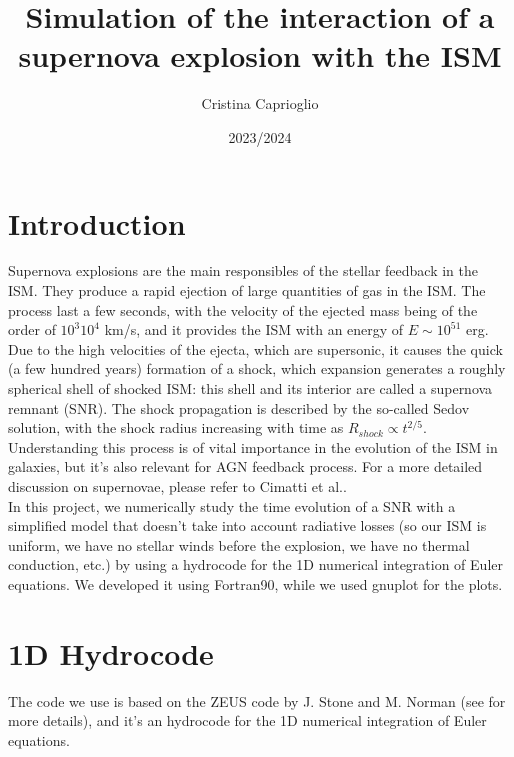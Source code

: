 \documentclass{article}
\title{Simulation of the interaction of a supernova explosion with the ISM}
\author{Cristina Caprioglio}
\date{2023/2024 }
\begin{document}
\maketitle

\section*{Introduction}\label{intro}
Supernova explosions are the main responsibles of the stellar feedback in the ISM. They produce a rapid ejection of large quantities of gas in the ISM. The process last a few seconds, with the velocity of the ejected mass being of the order of $10^{3}$\textemdash$10^{4}$ km/s, and it provides the ISM with an energy of $E\sim 10^{51}$ erg. Due to the high velocities of the ejecta, which are supersonic, it causes the quick (a few hundred years) formation of a shock, which expansion generates a roughly spherical shell of shocked ISM: this shell and its interior are called a supernova remnant (SNR). 
The shock propagation is described by the so-called Sedov solution, with the shock radius increasing with time as $R_{shock}\propto t^{2/5}$. Understanding this process is of vital importance in the evolution of the ISM in galaxies, but it's also relevant for AGN feedback process. 
For a more detailed discussion on supernovae, please refer to Cimatti et al.\cite[Sec. 8.7]{cimatti}.\\
In this project, we numerically study the time evolution of a SNR with a simplified model that doesn't take into account radiative losses (so our ISM is uniform,  we have no stellar winds before the explosion, we have no thermal conduction, etc.) by using a hydrocode for the 1D numerical integration of Euler equations. We developed it using Fortran90, while we used gnuplot for the plots.
\section{1D Hydrocode}
The code we use is based on the ZEUS code by J. Stone and M. Norman (see \cite{stone} for more details), and it's an hydrocode for the 1D numerical integration of Euler equations.
\end{document}
